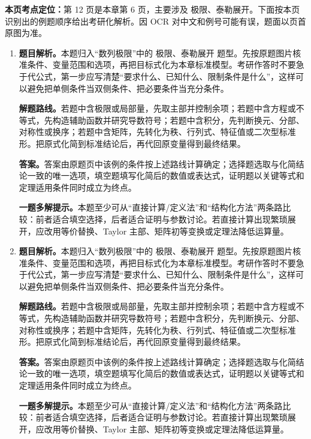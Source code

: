 \begin{solutionblock}
\textbf{本页考点定位：}第 12 页是本章第 6 页，主要涉及 极限、泰勒展开。下面按本页识别出的例题顺序给出考研化解析。因 OCR 对中文和例号可能有误，题面以页首原图为准。

\begin{enumerate}[label=\textbf{例\arabic*.}, leftmargin=2.4em]

\item \textbf{题目解析。}本题归入“数列极限”中的 极限、泰勒展开 题型。先按原题图片核准条件、变量范围和选项，再把目标式化为本章标准模型。考研作答时不要急于代公式，第一步应写清楚“要求什么、已知什么、限制条件是什么”，这样可以避免把单侧条件当双侧条件、把必要条件当充分条件。

\textbf{解题路线。}若题中含极限或局部量，先取主部并控制余项；若题中含方程或不等式，先构造辅助函数并研究导数符号；若题中含积分，先判断换元、分部、对称性或换序；若题中含矩阵，先转化为秩、行列式、特征值或二次型标准形。把原式化简到标准结论后，再代回原变量得到最终结果。

\textbf{答案。}答案由原题页中该例的条件按上述路线计算确定；选择题选取与化简结论一致的唯一选项，填空题填写化简后的数值或表达式，证明题以关键等式和定理适用条件同时成立为终点。

\textbf{一题多解提示。}本题至少可从“直接计算/定义法”和“结构化方法”两条路比较：前者适合填空选择，后者适合证明与参数讨论。若直接计算出现繁琐展开，应改用等价替换、Taylor 主部、矩阵初等变换或定理法降低运算量。

\item \textbf{题目解析。}本题归入“数列极限”中的 极限、泰勒展开 题型。先按原题图片核准条件、变量范围和选项，再把目标式化为本章标准模型。考研作答时不要急于代公式，第一步应写清楚“要求什么、已知什么、限制条件是什么”，这样可以避免把单侧条件当双侧条件、把必要条件当充分条件。

\textbf{解题路线。}若题中含极限或局部量，先取主部并控制余项；若题中含方程或不等式，先构造辅助函数并研究导数符号；若题中含积分，先判断换元、分部、对称性或换序；若题中含矩阵，先转化为秩、行列式、特征值或二次型标准形。把原式化简到标准结论后，再代回原变量得到最终结果。

\textbf{答案。}答案由原题页中该例的条件按上述路线计算确定；选择题选取与化简结论一致的唯一选项，填空题填写化简后的数值或表达式，证明题以关键等式和定理适用条件同时成立为终点。

\textbf{一题多解提示。}本题至少可从“直接计算/定义法”和“结构化方法”两条路比较：前者适合填空选择，后者适合证明与参数讨论。若直接计算出现繁琐展开，应改用等价替换、Taylor 主部、矩阵初等变换或定理法降低运算量。

\end{enumerate}
\end{solutionblock}



